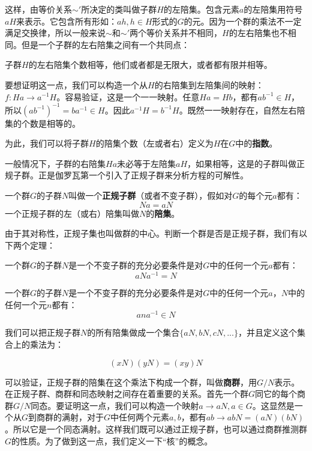 \documentclass{article}
\begin{document}
这样，由等价关系$\sim'$所决定的类叫做子群$H$的左陪集。包含元素$a$的左陪集用符号$aH$来表示。它包含所有形如：$ah, h \in H$形式的$G$的元。因为一个群的乘法不一定满足交换律，所以一般来说$\sim$和$\sim'$两个等价关系并不相同，$H$的左右陪集也不相同。但是一个子群的左右陪集之间有一个共同点：

\begin{theorem}
子群$H$的左右陪集个数相等，他们或者都是无限大，或者都有限并相等。
\end{theorem}

要想证明这一点，我们可以构造一个从$H$的右陪集到左陪集间的映射：$f: Ha \to a^{-1}H$。容易验证，这是一个一一映射。任意$Ha = Hb$，都有$ab^{-1} \in H$，所以$(ab^{-1})^{-1} = ba^{-1} \in H$。因此$a^{-1}H= b^{-1}H$。既然一一映射存在，自然左右陪集的个数是相等的。

为此，我们可以将子群$H$的陪集个数（左或者右）定义为$H$在$G$中的\textbf{指数}。

一般情况下，子群的右陪集$Ha$未必等于左陪集$aH$，如果相等，这是的子群叫做正规子群。正是伽罗瓦第一个引入了正规子群来分析方程的可解性。

 
\begin{definition}
一个群$G$的子群$N$叫做一个\textbf{正规子群}（或者不变子群），假如对$G$的每个元$a$都有：
\[
Na = aN
\]
一个正规子群的左（或右）陪集叫做$N$的\textbf{陪集}。
\label{normal-subgroup}
\end{definition}

由于其对称性，正规子集也叫做群的中心。判断一个群是否是正规子群，我们有以下两个定理：

\begin{theorem}
一个群$G$的子群$N$是一个不变子群的充分必要条件是对$G$中的任何一个元$a$都有：
\[
aNa^{-1} = N
\]
\end{theorem}

\begin{theorem}
一个群$G$的子群$N$是一个不变子群的充分必要条件是对$G$中的任何一个元$a$，$N$中的任何一个元$n$都有：
\[
ana^{-1} \in N
\]
\end{theorem}

我们可以把正规子群$N$的所有陪集做成一个集合$\{aN, bN, cN, ...\}$，并且定义这个集合上的乘法为：

\[
(xN)(yN) = (xy)N
\]

可以验证，正规子群的陪集在这个乘法下构成一个群，叫做\textbf{商群}，用$G/N$表示。在正规子群、商群和同态映射之间存在着重要的关系。首先一个群$G$同它的每个商群$G/N$同态。要证明这一点，我们可以构造一个映射$a \to aN, a \in G$。这显然是一个从$G$到商群的满射，对于$G$中任何两个元素$a, b$，都有$ab \to abN = (aN)(bN)$。所以它是一个同态满射。这样我们既可以通过正规子群，也可以通过商群推测群$G$的性质。为了做到这一点，我们定义一下“核”的概念。
\end{document}
